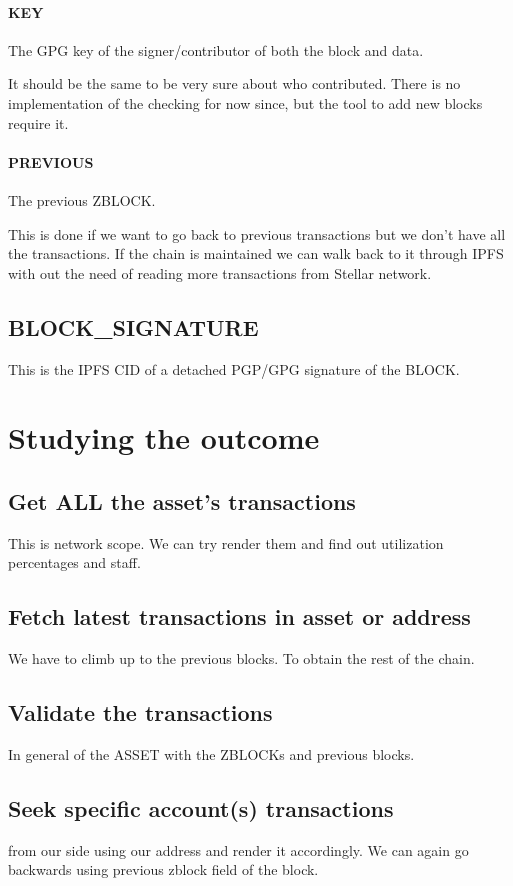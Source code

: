 \documentclass[10pt,a4paper,twocolumn]{paper}
\begin{document}
	\paragraph{KEY}\label{key}
	The GPG key of the signer/contributor of both the block and data.
	 
	 
	It should be the same to be very sure about who contributed. There is no implementation of the checking for now since, but the tool to add new blocks require it.
	 
	\paragraph{PREVIOUS}\label{previous}
	The previous ZBLOCK.
	 
	 
	This is done if we want to go back to previous transactions but we don't have all the transactions. If the chain is maintained we can walk back to it through IPFS with out the need of reading more transactions from Stellar network.
	
	
	\subsection{BLOCK\_SIGNATURE}\label{block-signature}
	This is the IPFS CID of a detached PGP/GPG signature of the BLOCK.
	
	\section{Studying the outcome}\label{study}
	\subsection{Get ALL the asset's transactions}
	This is network scope. We can try render them and find out utilization percentages and staff.
	\subsection{Fetch latest transactions in asset or address}
	We have to climb up to the previous blocks. To obtain the rest of the chain.
	\subsection{Validate the transactions}
	In general of the ASSET with the ZBLOCKs and previous blocks.
	\subsection{Seek specific account(s) transactions}
	from our side using our address and render it accordingly. We can again go backwards using previous zblock field of the block.
\end{document}
